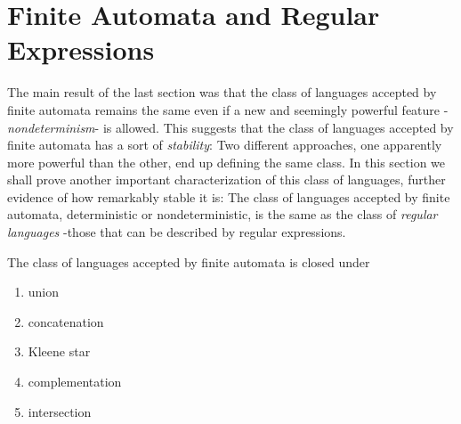 \section{Finite Automata and Regular Expressions}

The main result of the last section was that the class of languages accepted by finite automata remains the same even if a new and seemingly powerful feature -\textit{nondeterminism}- is allowed. This suggests that the class of languages accepted by finite automata has a sort of \textit{stability}: Two different approaches, one apparently more powerful than the other, end up defining the same class. In this section we shall prove another important characterization of this class of languages, further evidence of how remarkably stable it is: The class of languages accepted by finite automata, deterministic or nondeterministic, is the same as the class of \textit{regular languages} -those that can be described by regular expressions.

\begin{theorem}{}
  The class of languages accepted by finite automata is closed under 
  \begin{enumerate}[label=\alph*)]
    \item union
    \item concatenation
    \item Kleene star
    \item complementation
    \item intersection
  \end{enumerate}
\end{theorem}

